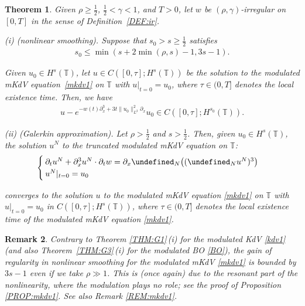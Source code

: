 \documentclass[letterpaper, 11pt,  reqno]{amsart}
\newtheorem{theorem}{Theorem} [section]
\newtheorem{remark}[theorem]{Remark}
\newcommand{\1}{\hspace{0.5mm}\text{I}\hspace{0.5mm}}
\newcommand{\noi}{\noindent}
\newcommand{\T}{\mathbb{T}}
\let\P= \undefined
\newcommand{\P}{\mathbf{P}}
\newcommand{\g}{\gamma}
\newcommand{\dx}{\partial_x}
\newcommand{\dt}{\partial_t}
\numberwithin{equation}{section}
\numberwithin{theorem}{section}
\begin{document}
\begin{theorem}\label{THM:G2}
Given $\rho \ge\frac 12$,  $\frac12< \g < 1$, and $T> 0$, 
let  $w$ be $(\rho,\g)$-irregular on $[0, T]$ in the sense of Definition~\ref{DEF:ir}.



\smallskip

\noi
\textup{(i) (nonlinear smoothing).}
Suppose that 
$s_0 > s \ge \frac 12$ satisfies 
\begin{align}
 s_0 \le \min(s + 2 \min(\rho, s) - 1, 3s - 1).
\label{regM2}
\end{align}

\noi
Given $u_0 \in H^s(\T)$, 
let $u
\in C([0, \tau]; H^s(\T))$ be the  solution 
to the modulated mKdV equation~\eqref{mkdv1}
on $\T$
with $u|_{t = 0} = u_0$, 
where 
$\tau \in (0,  T]$ denotes the local existence time.
Then, we have 
\begin{align*}
 u - e^{-w(t) \dx^3 + 3t\|u_0\|_{L^2}^2\dx}u_0 \in C([0, \tau]; H^{s_0}(\T)).
\end{align*}


\smallskip

\noi
\textup{(ii) (Galerkin approximation).}
Let $\rho > \frac 12$ and 
$s > \frac 12$.
Then, given $u_0 \in H^s(\T)$, 
the solution $u^N$ to the truncated modulated mKdV equation 
on $\T$\textup{:}
\begin{equation*}
\begin{cases}
\dt u^N+  \dx^3 u^N \cdot \dt w =\dx \P_N\big((\P_Nu^N)^3\big)\\
u^N|_{t = 0} = u_0
\end{cases}
\end{equation*}


\noi
converges to the solution $u$
to the modulated mKdV equation \eqref{mkdv1}
on $\T$
with $u|_{t = 0} = u_0$
in $C([0, \tau]; H^s(\T))$, 
where $\tau  \in (0, T]$ denotes the local existence time of the modulated mKdV equation
\eqref{mkdv1}.
%
%

\end{theorem}




\begin{remark}\label{REM:mkdv2}\rm
Contrary to Theorem \ref{THM:G1}\,(i) for
the modulated KdV \eqref{kdv1} (and also Theorem~\ref{THM:G3}\,(i) for 
the modulated BO \eqref{BO}), 
the gain of regularity 
in nonlinear smoothing for the modulated mKdV \eqref{mkdv1}
is bounded by $3s - 1$ even if we take $\rho \gg1$.
This is (once again) due to the resonant part of the nonlinearity, where
the modulation plays no role; 
see the proof of Proposition \ref{PROP:mkdv1}.
See also Remark \ref{REM:mkdv1}.

\end{remark}
\end{document}
